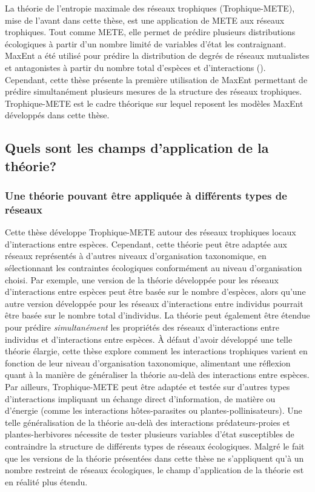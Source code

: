 La théorie de l'entropie maximale des réseaux trophiques (Trophique-METE), mise
de l'avant dans cette thèse, est une application de METE aux réseaux trophiques.
Tout comme METE, elle permet de prédire plusieurs distributions écologiques à
partir d'un nombre limité de variables d'état les contraignant. MaxEnt a été
utilisé pour prédire la distribution de degrés de réseaux mutualistes et
antagonistes à partir du nombre total d'espèces et d'interactions
(\cite{Williams2011Biology}). Cependant, cette thèse présente la première
utilisation de MaxEnt permettant de prédire simultanément plusieurs mesures de
la structure des réseaux trophiques. Trophique-METE est le cadre théorique sur
lequel reposent les modèles MaxEnt développés dans cette thèse.

\subsection{Quels sont les champs d'application de la théorie?} 

\subsubsection{Une théorie pouvant être appliquée à différents types de réseaux} 

Cette thèse développe Trophique-METE autour des réseaux trophiques locaux
d'interactions entre espèces. Cependant, cette théorie peut être adaptée aux
réseaux représentés à d'autres niveaux d'organisation taxonomique, en
sélectionnant les contraintes écologiques conformément au niveau d'organisation
choisi. Par exemple, une version de la théorie développée pour les réseaux
d'interactions entre espèces peut être basée sur le nombre d'espèces, alors
qu'une autre version développée pour les réseaux d'interactions entre individus
pourrait être basée sur le nombre total d'individus. La théorie peut également
être étendue pour prédire \textit{simultanément} les propriétés des réseaux
d'interactions entre individus et d'interactions entre espèces. À défaut d'avoir
développé une telle théorie élargie, cette thèse explore comment les
interactions trophiques varient en fonction de leur niveau d'organisation
taxonomique, alimentant une réflexion quant à la manière de généraliser la
théorie au-delà des interactions entre espèces. Par ailleurs, Trophique-METE
peut être adaptée et testée sur d'autres types d'interactions impliquant un
échange direct d'information, de matière ou d'énergie (comme les interactions
hôtes-parasites ou plantes-pollinisateurs). Une telle généralisation de la
théorie au-delà des interactions prédateurs-proies et plantes-herbivores
nécessite de tester plusieurs variables d'état susceptibles de contraindre la
structure de différents types de réseaux écologiques. Malgré le fait que les
versions de la théorie présentées dans cette thèse ne s'appliquent qu'à un
nombre restreint de réseaux écologiques, le champ d'application de la théorie
est en réalité plus étendu.

